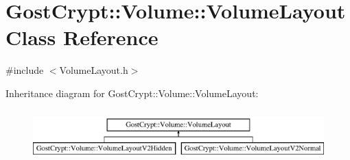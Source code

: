 \hypertarget{class_gost_crypt_1_1_volume_1_1_volume_layout}{}\section{Gost\+Crypt\+:\+:Volume\+:\+:Volume\+Layout Class Reference}
\label{class_gost_crypt_1_1_volume_1_1_volume_layout}


{\ttfamily \#include $<$Volume\+Layout.\+h$>$}

Inheritance diagram for Gost\+Crypt\+:\+:Volume\+:\+:Volume\+Layout\+:\begin{figure}[H]
\begin{center}
\leavevmode
\includegraphics[height=2.000000cm]{class_gost_crypt_1_1_volume_1_1_volume_layout}
\end{center}
\end{figure}

